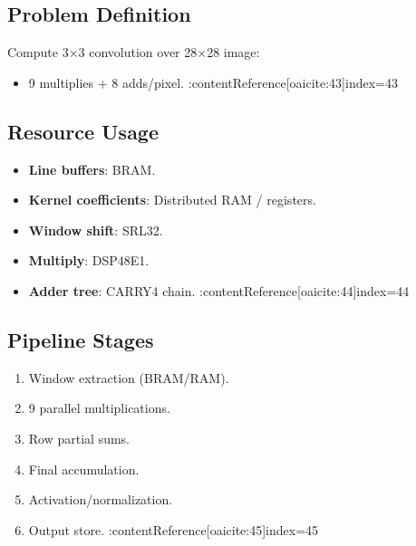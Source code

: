 \documentclass[11pt]{article}
\begin{document}
\subsection{Problem Definition}
Compute 3×3 convolution over 28×28 image:
\begin{itemize}
    \item 9 multiplies + 8 adds/pixel. :contentReference[oaicite:43]{index=43}
\end{itemize}

\subsection{Resource Usage}
\begin{itemize}
    \item \textbf{Line buffers}: BRAM.
    \item \textbf{Kernel coefficients}: Distributed RAM / registers.
    \item \textbf{Window shift}: SRL32.
    \item \textbf{Multiply}: DSP48E1.
    \item \textbf{Adder tree}: CARRY4 chain. :contentReference[oaicite:44]{index=44}
\end{itemize}

\subsection{Pipeline Stages}
\begin{enumerate}
    \item Window extraction (BRAM/RAM).
    \item 9 parallel multiplications.
    \item Row partial sums.
    \item Final accumulation.
    \item Activation/normalization.
    \item Output store. :contentReference[oaicite:45]{index=45}
\end{enumerate}
\end{document}
